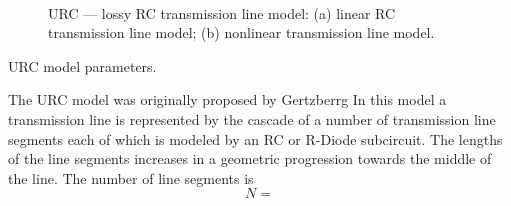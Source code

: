 

\begin{figure}[h]
\centering
\ 
\caption[URC --- lossy RC transmission line model]{URC --- lossy RC transmission
line model: (a) linear RC transmission
line model; (b) nonlinear transmission line model. \label{urc:fig}}
\end{figure}
\clearpage
{}



\begin{table}[h]
\caption{URC model parameters. \label{urctable}}
\end{table}

The URC model was originally proposed by Gertzberrg \cite{gertzberg:74}
In this model a transmission line is represented by the cascade of a number of
transmission line segments each of which is modeled by an
RC or R-Diode subcircuit.  The lengths of the line segments
increases in a geometric progression towards the middle of the line.
The number of line segments is
\begin{equation}
N =
\end{equation}

